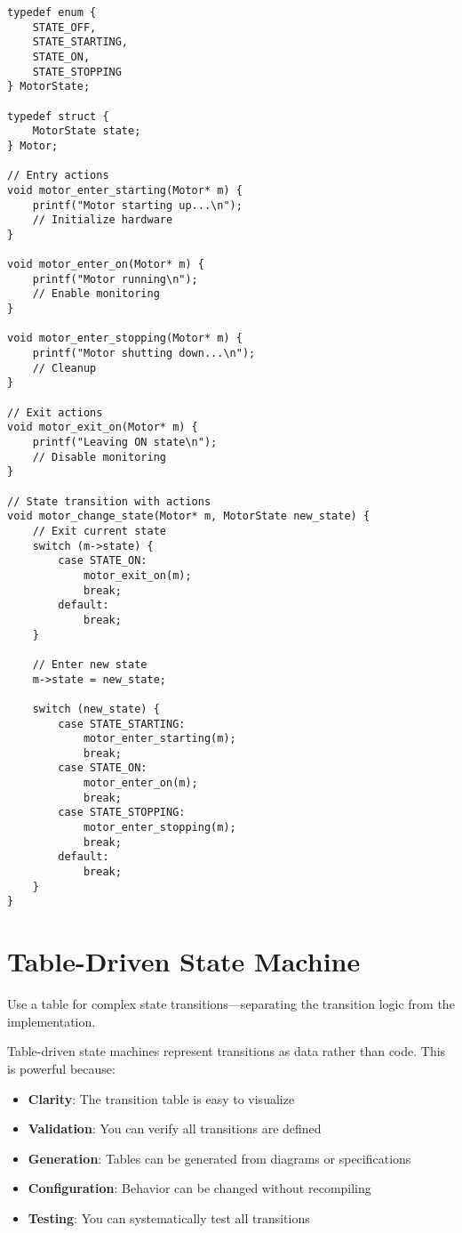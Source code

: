 \begin{lstlisting}
typedef enum {
    STATE_OFF,
    STATE_STARTING,
    STATE_ON,
    STATE_STOPPING
} MotorState;

typedef struct {
    MotorState state;
} Motor;

// Entry actions
void motor_enter_starting(Motor* m) {
    printf("Motor starting up...\n");
    // Initialize hardware
}

void motor_enter_on(Motor* m) {
    printf("Motor running\n");
    // Enable monitoring
}

void motor_enter_stopping(Motor* m) {
    printf("Motor shutting down...\n");
    // Cleanup
}

// Exit actions
void motor_exit_on(Motor* m) {
    printf("Leaving ON state\n");
    // Disable monitoring
}

// State transition with actions
void motor_change_state(Motor* m, MotorState new_state) {
    // Exit current state
    switch (m->state) {
        case STATE_ON:
            motor_exit_on(m);
            break;
        default:
            break;
    }

    // Enter new state
    m->state = new_state;

    switch (new_state) {
        case STATE_STARTING:
            motor_enter_starting(m);
            break;
        case STATE_ON:
            motor_enter_on(m);
            break;
        case STATE_STOPPING:
            motor_enter_stopping(m);
            break;
        default:
            break;
    }
}
\end{lstlisting}

\section{Table-Driven State Machine}

Use a table for complex state transitions—separating the transition logic from the implementation.

Table-driven state machines represent transitions as data rather than code. This is powerful because:

\begin{itemize}
    \item \textbf{Clarity}: The transition table is easy to visualize
    \item \textbf{Validation}: You can verify all transitions are defined
    \item \textbf{Generation}: Tables can be generated from diagrams or specifications
    \item \textbf{Configuration}: Behavior can be changed without recompiling
    \item \textbf{Testing}: You can systematically test all transitions
\end{itemize}

